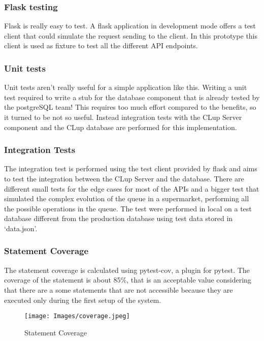 \subsubsection{Flask testing}
Flask is really easy to test. A flask application in development mode offers a test client that could simulate the request sending to the client. In this prototype this client is used as fixture to test all the different API endpoints.

\subsubsection{Unit tests}
Unit tests aren't really useful for a simple application like this. Writing a unit test required to write a stub for the database component that is already tested by the postgreSQL team! This requires too much effort compared to the benefits, so it turned to be not so useful. Instead integration tests with the CLup Server component and the CLup database are performed for this implementation.

\subsubsection{Integration Tests}
The integration test is performed using the test client provided by flask and aims to test the integration between the CLup Server and the database. There are different small tests for the edge cases  for most of the APIs and a bigger test that simulated the complex evolution of the queue in a supermarket, performing all the possible operations in the queue. The test were performed in local on a test database different from the production database using test data stored in `data.json'. 

\subsubsection{Statement Coverage}
The statement coverage is calculated using pytest-cov, a plugin for pytest. The coverage of the statement is about 85\%, that is an acceptable value considering that there are a some statements that are not accessible because they are executed only during the first setup of the system.
\begin{figure}[h!t]
    \centering
    \texttt{[image: Images/coverage.jpeg]}
    \caption{\label{fig:General Component}Statement Coverage}
\end{figure}